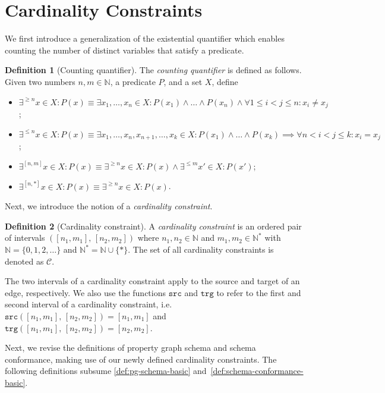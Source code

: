 \documentclass{report}
\theoremstyle{definition}
\newtheorem{definition}{Definition}
\newcommand{\N}{\mathbb{N}}
\newcommand{\src}{\mathtt{src}}
\newcommand{\trg}{\mathtt{trg}}
\begin{document}
\section{Cardinality Constraints}
\label{sec:cardinality}

We first introduce a generalization of the existential quantifier which enables counting the number of distinct variables that satisfy a predicate.

\begin{definition}[Counting quantifier]
  The \emph{counting quantifier} is defined as follows. Given two numbers $n, m \in \N$, a predicate $P$, and a set $X$, define
  \begin{itemize}
    \item $\exists^{\geq n} x \in X : P(x) \equiv \exists x_1, \ldots, x_n \in X : P(x_1) \wedge \ldots \wedge P(x_n) \wedge \forall 1 \leq i < j \leq n : x_i \neq x_j$;
    \item $\exists^{\leq n} x \in X : P(x) \equiv \exists x_1, \ldots, x_n, x_{n+1}, \ldots, x_k \in X : P(x_1) \wedge \ldots \wedge P(x_k) \implies \forall n < i < j \leq k : x_i = x_j$;
    \item $\exists^{[n, m]} x \in X : P(x) \equiv \exists^{\geq n} x \in X : P(x) \wedge \exists^{\leq m} x' \in X : P(x')$;
    \item $\exists^{[n, *]} x \in X : P(x) \equiv \exists^{\geq n} x \in X : P(x)$.
  \end{itemize}
\end{definition}

Next, we introduce the notion of a \emph{cardinality constraint}.

\begin{definition}[Cardinality constraint]
  \label{def:cardinality-constraint}
  A \emph{cardinality constraint} is an ordered pair of intervals $([n_1, m_1], \, [n_2, m_2])$ where $n_1, n_2 \in \N$ and $m_1, m_2 \in \N^*$ with $\N = \{0, 1, 2, \ldots\}$ and $\N^* = \N \cup \{*\}$. The set of all cardinality constraints is denoted as $\mathcal{C}$.
\end{definition}

The two intervals of a cardinality constraint apply to the source and target of an edge, respectively. We also use the functions $\src$ and $\trg$ to refer to the first and second interval of a cardinality constraint, i.e. $\src([n_1, m_1], \, [n_2, m_2]) = [n_1, m_1]$ and $\trg([n_1, m_1], \, [n_2, m_2]) = [n_2, m_2]$.

Next, we revise the definitions of property graph schema and schema conformance, making use of our newly defined cardinality constraints. The following definitions subsume \autoref{def:pg-schema-basic} and~\ref{def:schema-conformance-basic}.
\end{document}
